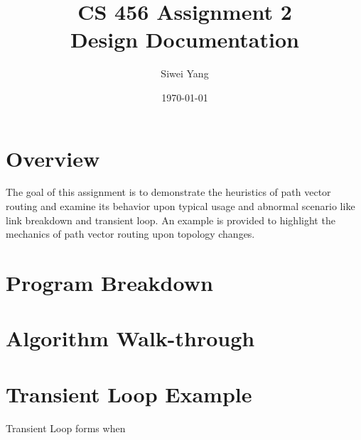 \documentclass[12pt]{article}
\begin{document}
\title{CS 456 Assignment 2\\Design Documentation}
\date{\today}
\author{Siwei Yang}
\maketitle

\section{Overview}
The goal of this assignment is to demonstrate the heuristics of path vector routing and examine its behavior upon typical usage and abnormal scenario like link breakdown and transient loop. An example is provided to highlight the mechanics of path vector routing upon topology changes.

\section{Program Breakdown}

\section{Algorithm Walk-through}


\section{Transient Loop Example}
Transient Loop forms when
\end{document}
